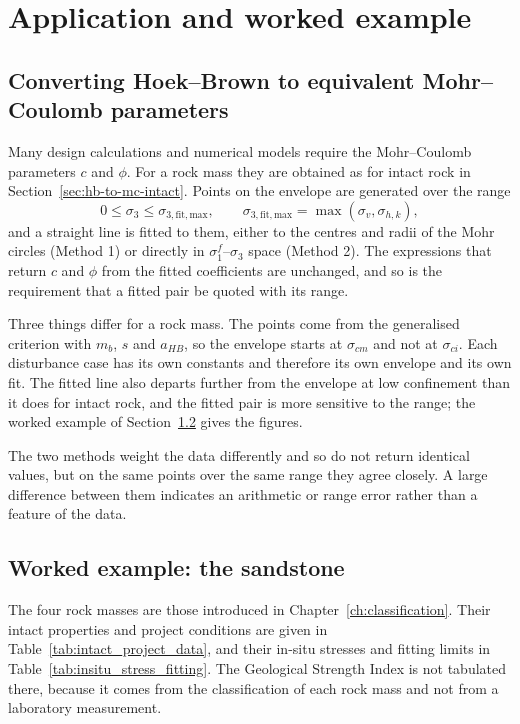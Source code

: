 \section{Application and worked example}
\label{sec:application-and-verification}

\subsection{Converting Hoek--Brown to equivalent Mohr--Coulomb parameters}
\label{sec:hb-to-mc}

Many design calculations and numerical models require the Mohr--Coulomb
parameters \(c\) and \(\phi\). For a rock mass they are obtained as for intact
rock in Section~\ref{sec:hb-to-mc-intact}. Points on the envelope are
generated over the range
\[
0 \leq \sigma_3 \leq \sigma_{3,\mathrm{fit,max}} ,
\qquad
\sigma_{3,\mathrm{fit,max}}=\max(\sigma_v,\sigma_{h,k}) ,
\]
and a straight line is fitted to them, either to the centres and radii of the
Mohr circles (Method 1) or directly in \(\sigma_1^f\)--\(\sigma_3\) space
(Method 2). The expressions that return \(c\) and \(\phi\) from the fitted
coefficients are unchanged, and so is the requirement that a fitted pair be
quoted with its range.

Three things differ for a rock mass. The points come from the generalised
criterion with \(m_b\), \(s\) and \(a_{HB}\), so the envelope starts at
\(\sigma_{cm}\) and not at \(\sigma_{ci}\). Each disturbance case has its own
constants and therefore its own envelope and its own fit. The fitted line also
departs further from the envelope at low confinement than it does for intact
rock, and the fitted pair is more sensitive to the range; the worked example
of Section~\ref{sec:sandstone-worked-example} gives the figures.

The two methods weight the data differently and so do not return identical
values, but on the same points over the same range they agree closely. A
large difference between them indicates an arithmetic or range error rather
than a feature of the data.

\subsection{Worked example: the sandstone}
\label{sec:sandstone-worked-example}
\label{sec:parameter-design-data}

The four rock masses are those introduced in Chapter~\ref{ch:classification}.
Their intact properties and project conditions are given in
Table~\ref{tab:intact_project_data}, and their in-situ stresses and fitting
limits in Table~\ref{tab:insitu_stress_fitting}. The Geological Strength Index
is not tabulated there, because it comes from the classification of each rock
mass and not from a laboratory measurement.

